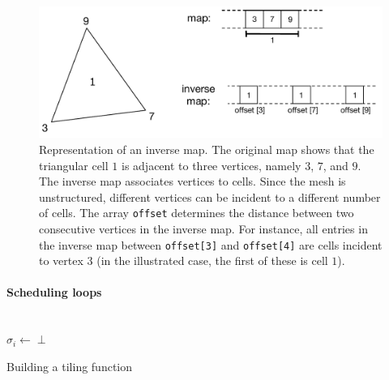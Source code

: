 \begin{figure}
\begin{CenteredBox}
\includegraphics[scale=0.7]{sparsetiling/figures/inverse_map}
\end{CenteredBox}
\caption{Representation of an inverse map. The original map shows that the triangular cell $1$ is adjacent to three vertices, namely $3$, $7$, and $9$. The inverse map associates vertices to cells. Since the mesh is unstructured, different vertices can be incident to a different number of cells. The array {\tt offset} determines the distance between two consecutive vertices in the inverse map. For instance, all entries in the inverse map between {\tt offset[3]} and {\tt offset[4]} are cells incident to vertex $3$ (in the illustrated case, the first of these is cell $1$).}
\label{fig:st-inverse-map}
\end{figure}


\paragraph{Scheduling loops} 

\begin{algorithm}[t]
\nonl ~\\
$\sigma_i \gets \perp$\;
\caption{Building a tiling function}
\label{algo:st-tiling}
\end{algorithm}

